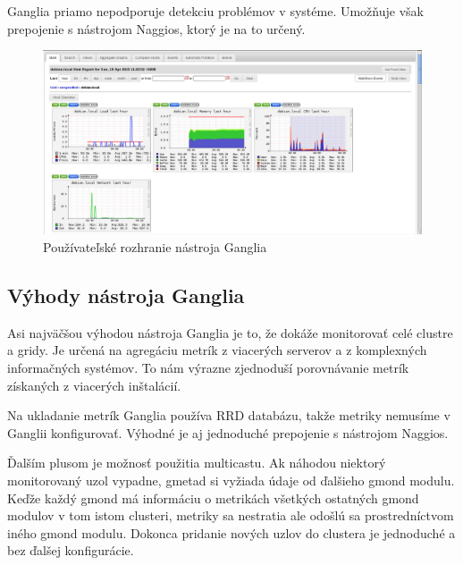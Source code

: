\documentclass[a4paper, upjsfrontpage, thesismargins, thesislinespacing]{rnthesis}
\begin{document}

Ganglia priamo nepodporuje detekciu problémov v systéme.
Umožňuje však prepojenie s nástrojom Naggios, ktorý je na to určený.

\begin{figure}
	\begin{center}
		\includegraphics[scale=0.41]{ganglia.png}
	\end{center}
	\caption{Používateľské rozhranie nástroja Ganglia}
\end{figure}

\subsection{Výhody nástroja Ganglia}

Asi najväčšou výhodou nástroja Ganglia je to, že dokáže monitorovať celé clustre a gridy.
Je určená na agregáciu metrík z viacerých serverov a z komplexných informačných systémov.
To nám výrazne zjednoduší porovnávanie metrík získaných z viacerých inštalácií.

Na ukladanie metrík Ganglia používa RRD databázu, takže metriky nemusíme v Ganglii konfigurovať.
Výhodné je aj jednoduché prepojenie s nástrojom Naggios.

Ďalším plusom je možnosť použitia multicastu.
Ak náhodou niektorý monitorovaný uzol vypadne, gmetad si vyžiada údaje od ďalšieho gmond modulu.
Keďže každý gmond má informáciu o metrikách všetkých ostatných gmond modulov v tom istom clusteri,
metriky sa nestratia ale odošlú sa prostredníctvom iného gmond modulu. 
Dokonca pridanie nových uzlov do clustera je jednoduché a bez ďalšej konfigurácie.

\end{document}
